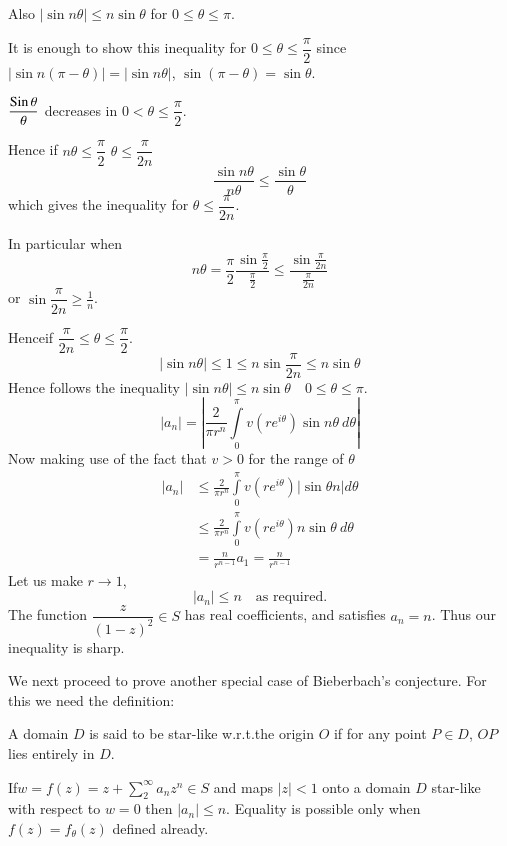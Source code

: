 Also $|\sin n\theta|\leq n\sin\theta$ for $0\leq \theta\leq \pi$.

It is enough to show this inequality for $0\leq \theta\leq
\dfrac{\pi}{2}$ since $|\sin n(\pi-\theta)|=|\sin n\theta|$,
$\sin(\pi-\theta)=\sin\theta$. 

$\dfrac{\operatorname{Sin}\theta}{\theta}$ decreases in $0<\theta\leq
\dfrac{\pi}{2}$.

Hence if $n\theta\leq\dfrac{\pi}{2}$ \ie $\theta\leq \dfrac{\pi}{2n}$
$$
\frac{\sin n\theta}{n\theta}\leq \frac{\sin\theta}{\theta}
$$
which gives the inequality for $\theta\leq \dfrac{\pi}{2n}$.

In particular when
$$
n\theta=\dfrac{\pi}{2}\dfrac{\sin\frac{\pi}{2}}{\frac{\pi}{2}}\leq\dfrac{\sin\frac{\pi}{2n}}{\frac{\pi}{2n}}
$$
or $\sin\dfrac{\pi}{2n}\geq \frac{1}{n}$.

Hence\pageoriginale if $\dfrac{\pi}{2n}\leq \theta\leq \dfrac{\pi}{2}$.
$$
|\sin n\theta|\leq 1\leq n\sin\dfrac{\pi}{2n}\leq n\sin \theta
$$
Hence follows the inequality $|\sin n\theta|\leq n\sin\theta \quad 0\leq
\theta\leq \pi$.
$$
|a_{n}|=\left|\frac{2}{\pi
  r^{n}}\int\limits^{\pi}_{0}v(re^{i\theta})\sin n\theta
\ d\theta\right|
$$
Now making use of the fact that $v>0$ for the range of $\theta$
\begin{align*}
|a_{n}| &\leq \frac{2}{\pi
  r^{n}}\int\limits^{\pi}_{0}v(re^{i\theta})|\sin\theta n|d\theta\\
&\leq \frac{2}{\pi
  r^{n}}\int\limits^{\pi}_{0}v(re^{i\theta})n\sin\theta\ d\theta\\
&= \frac{n}{r^{n-1}}a_{1}=\frac{n}{r^{n-1}}
\end{align*}
Let us make $r\to 1$,
$$
|a_{n}|\leq n\quad\text{as required.}
$$
The function $\dfrac{z}{(1-z)^{2}}\in S$ has real coefficients, and
satisfies $a_{n}=n$. Thus our inequality is sharp.

We next proceed to prove another special case of Bieberbach's
conjecture. For this we need the definition:

\begin{defi*}
A domain $D$ is said to be star-like w.r.t.\@ the origin $O$ if for
any point $P\in D$, $OP$ lies entirely in $D$.
\end{defi*}

\begin{thm}[Nevanlinna]\label{part3-thm8}
If\pageoriginale $w=f(z)=z+\sum\limits^{\infty}_{2}a_{n}z^{n}\in S$
and maps $|z|<1$ onto a domain $D$ star-like with respect to $w=0$
then $|a_{n}|\leq n$. Equality is possible only when
$f(z)=f_{\theta}(z)$ defined already.
\end{thm}

